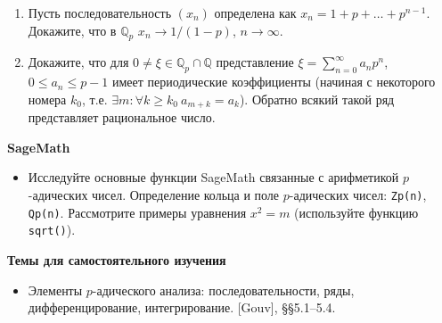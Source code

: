 \begin{enumerate}[topsep=0pt]
    \item Пусть последовательность $(x_n)$ определена как $x_n = 1+p+\dots +p^{n-1}$. Докажите, что в $\mathbb{Q}_p$ $x_n \rightarrow 1/(1-p)$, $n \rightarrow \infty$. %

    
    \item Докажите, что для $0 \neq \xi \in \mathbb{Q}_p \cap \mathbb{Q}$ представление $\xi = \sum_{n=0}^{\infty} a_n p^n$, $0 \leqslant a_n \leqslant p-1$ имеет периодические коэффициенты (начиная с некоторого номера $k_0$, т.е. $\exists m: \forall k \ge k_0\ a_{m+k} = a_{k}$). Обратно всякий такой ряд представляет рациональное число.
    
\end{enumerate}

\noindent\textbf{SageMath}

\begin{itemize}[topsep=0pt]
    \item Исследуйте основные функции SageMath связанные с арифметикой $p$-адических чисел. Определение кольца и поле $p$-адических чисел: \texttt{Zp(n)}, \texttt{Qp(n)}. Рассмотрите примеры уравнения $x^2=m$ (используйте функцию \texttt{sqrt()}).
        
\end{itemize}

\noindent\textbf{Темы для самостоятельного изучения}
\begin{itemize}[topsep=0pt]
    \item Элементы $p$-адического анализа: последовательности, ряды, дифференцирование, интегрирование. [Gouv], \S\S 5.1--5.4.
\end{itemize}

